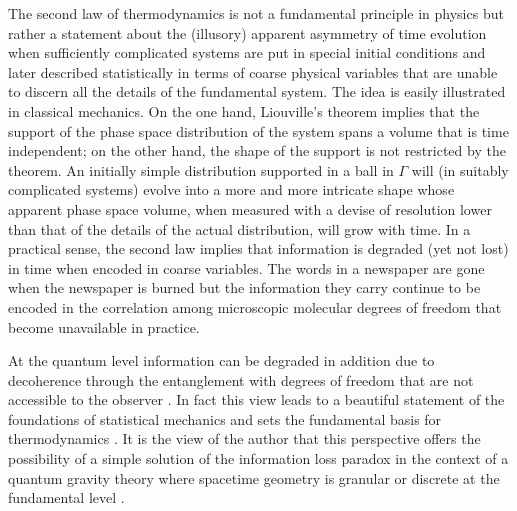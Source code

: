 \documentclass[aps, nofootinbib,superscriptaddress,12pt]{revtex4-2}
\begin{document}
\begin{enumerate}
The second law of thermodynamics is not a fundamental principle in physics but rather a statement
about the (illusory) apparent asymmetry of time evolution when sufficiently complicated systems are put in special initial conditions and later described statistically in terms of coarse physical variables that are unable to discern all the details of the fundamental system. The idea is easily illustrated in classical mechanics. On the one hand, Liouville's theorem implies that the support of the phase space distribution of the system spans a volume that is time independent; on the other hand, the shape of the support is not restricted by the theorem. An initially simple distribution supported in a ball in $\Gamma$ will (in suitably complicated systems) evolve into a more and more intricate shape whose apparent phase space volume, when measured with a devise of resolution lower than that of the details of the actual distribution, will grow with time.    
In a practical sense, the second law implies that information is degraded (yet not lost) in time when encoded in 
coarse variables. The words in a newspaper are gone when the newspaper is burned but the information they carry continue to be encoded in the correlation among microscopic molecular degrees of freedom that become unavailable in practice. 

At the quantum level information can be degraded in addition due to decoherence through the entanglement with degrees of freedom that are not accessible to the observer \cite{thibaut}. In fact this view leads to a beautiful statement of the foundations of statistical mechanics and sets the fundamental basis for thermodynamics \cite{popescu, thibaut}. It is the view of the author that this perspective offers the possibility of a simple solution of the information loss paradox in the context of a quantum gravity theory where spacetime geometry is granular or discrete at the fundamental level \cite{Perez:2014xca}. 


\end{enumerate}
\end{document}
